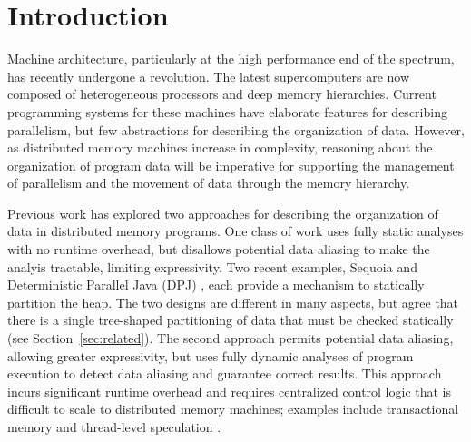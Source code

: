 

\section{Introduction}
\label{sec:intro}

Machine architecture, particularly at the high
performance end of the spectrum, has recently undergone a revolution.  The
latest supercomputers are now composed of heterogeneous processors
and deep memory hierarchies.  Current programming systems for these
machines have elaborate features for describing parallelism, but 
few abstractions for describing the organization of data.  However, as 
distributed memory machines increase in complexity,
reasoning about the organization of program data will be imperative
for supporting the management of parallelism and the movement of data
through the memory hierarchy.



Previous work has explored two approaches for describing the organization of data
in distributed memory programs.
One class of work uses fully static analyses with no runtime overhead, but 
disallows potential data aliasing to make the analyis tractable, limiting expressivity.
Two recent examples, Sequoia \cite{Fatahalian06} and 
Deterministic Parallel Java (DPJ) \cite{Bocchino09}, each provide a 
mechanism to statically partition the heap.
The two designs are different in many aspects, but agree that there is
a single tree-shaped partitioning of data that must be checked statically 
(see Section~\ref{sec:related}).  The second approach permits potential data
aliasing, allowing greater expressivity, but uses fully dynamic analyses of
program execution to detect data aliasing and guarantee correct results.
This approach incurs significant runtime overhead and requires 
centralized control logic that is difficult to scale to distributed 
memory machines; examples include transactional memory \cite{Harris05} 
and thread-level speculation \cite{Steffan00}.

